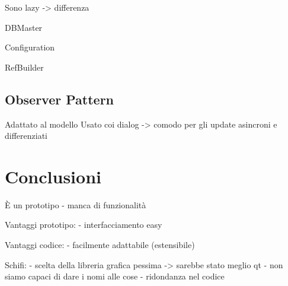 \documentclass[a4paper, 11pt]{article}
\begin{document}
Sono lazy -> differenza

DBMaster

Configuration

RefBuilder

\subsection{Observer Pattern}
Adattato al modello
Usato coi dialog -> comodo per gli update asincroni e differenziati

\section{Conclusioni}
È un prototipo - manca di funzionalità

Vantaggi prototipo:
- interfacciamento easy

Vantaggi codice:
- facilmente adattabile (estensibile)

Schifi:
- scelta della libreria grafica pessima -> sarebbe stato meglio qt
- non siamo capaci di dare i nomi alle cose
- ridondanza nel codice
\end{document}
